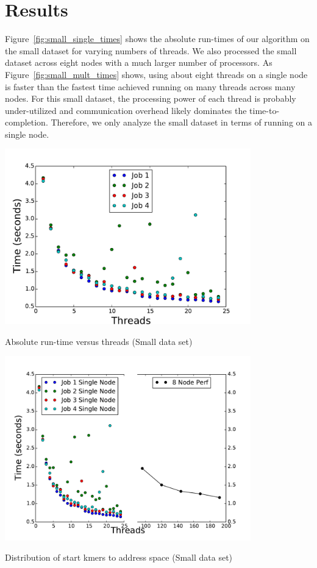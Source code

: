 \documentclass{article}
\begin{document}
\section{Results}

Figure~\ref{fig:small_single_times} shows the absolute run-times of our algorithm on the small dataset for varying numbers of threads. We also processed the small dataset across eight nodes with a much larger number of processors. As Figure~\ref{fig:small_mult_times} shows, using about eight threads on a single node is faster than the fastest time achieved running on many threads across many nodes. For this small dataset, the processing power of each thread is probably under-utilized and communication overhead likely dominates the time-to-completion. Therefore, we only analyze the small dataset in terms of running on a single node.

\begin{minipage}{\linewidth}
  \captionsetup{type=figure}
  \begin{center}
  \includegraphics[width=0.8\textwidth]{SingleTime.pdf}
  \end{center}
  \caption{Absolute run-time versus threads (Small data set)} \label{fig:small_single_times}
\end{minipage}


\begin{minipage}{\linewidth}
  \captionsetup{type=figure}
  \begin{center}
  \includegraphics[width=0.8\textwidth]{CombineTimes.pdf}
  \end{center}
  \caption{Distribution of start kmers to address space (Small data set)} \label{fig:small_mult_times}
\end{minipage}
\end{document}
